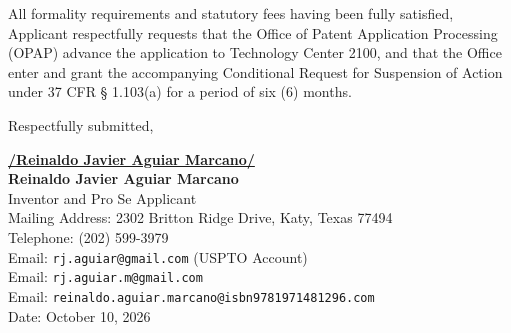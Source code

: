 \documentclass[11pt,letterpaper]{article}
\begin{document}
All formality requirements and statutory fees having been fully satisfied, Applicant respectfully requests that the Office of Patent Application Processing (OPAP) advance the application to Technology Center 2100, and that the Office enter and grant the accompanying Conditional Request for Suspension of Action under 37 CFR \S{} 1.103(a) for a period of six (6) months.

\vspace{0.6cm}
\begin{singlespace}
\noindent Respectfully submitted, \par\vspace{0.8cm}
\underline{\textbf{/Reinaldo Javier Aguiar Marcano/}} \\
\textbf{Reinaldo Javier Aguiar Marcano} \\
Inventor and Pro Se Applicant \\
Mailing Address: 2302 Britton Ridge Drive, Katy, Texas 77494 \\
Telephone: (202) 599-3979 \\
Email: \texttt{rj.aguiar@gmail.com} (USPTO Account) \\
Email: \texttt{rj.aguiar.m@gmail.com} \\
Email: \texttt{reinaldo.aguiar.marcano@isbn9781971481296.com} \\
Date: October 10, 2026
\end{singlespace}
\end{document}
